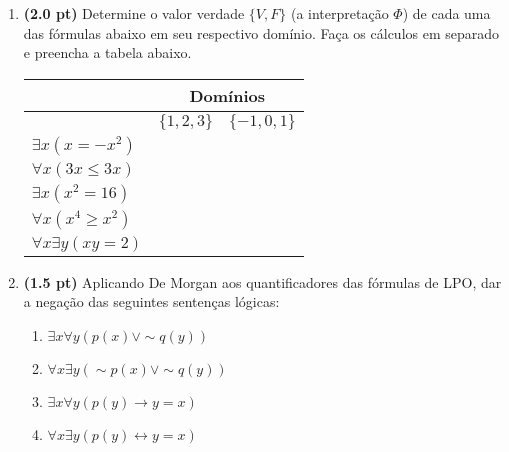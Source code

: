\documentclass[a4paper,12pt]{article}
\begin{document}
\begin{enumerate}
\item {\bf (2.0 pt)} Determine o valor verdade $\{V, F \}$ (a interpretação $\Phi $)
de cada uma das fórmulas abaixo em seu respectivo domínio.
Faça os cálculos em separado e preencha a tabela abaixo.
\begin{center}
\begin{tabular}{l|l|l|} \hline \hline
 & \multicolumn{2}{c}{Domínios} \\ \hline
 & $\{1,2,3\}$ & $\{-1,0,1\}$ \\ \hline
$\exists x (x = -x^2)$ & & \\ \hline
$\forall x (3x \leq 3x)$ & &\\ \hline
$\exists x (x^2 = 16)$ & & \\ \hline
$\forall x (x^4 \geq x^2)$ & &  \\ \hline
$\forall x \exists y (xy = 2)$ & & \\ \hline \hline
\end{tabular}
\end{center}



\item {\bf (1.5 pt)} Aplicando De Morgan aos
quantificadores das fórmulas de LPO, dar a
negação das seguintes sentenças lógicas:
\begin{enumerate}
\setlength{\itemsep}{-2pt}
 \item $ \exists x \forall y (p(x) \vee \sim q(y))$
 \item $ \forall x \exists y (\sim p(x) \vee \sim q(y))$
  \item  $ \exists x \forall y (p(y) \rightarrow y = x)$
  \item  $ \forall x \exists y (p(y) \leftrightarrow y = x)$
\end{enumerate}


\end{enumerate}
\end{document}
